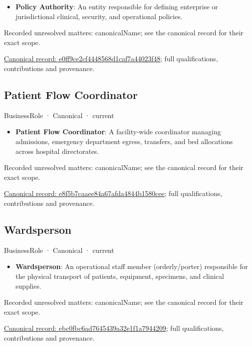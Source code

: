 \begin{itemize}


\item \textbf{Policy Authority}: An entity responsible for defining enterprise or jurisdictional clinical, security, and operational policies.

\end{itemize}

{\small Recorded unresolved matters: canonicalName; see the canonical record for their exact scope.}\par
{\footnotesize \href{../../../../continuum/business/business-role/e0ff9ce2cf4448568d1caf7a44023f48.md}{Canonical record: e0ff9ce2cf4448568d1caf7a44023f48}; full qualifications, contributions and provenance.}\par
\subsection{Patient Flow Coordinator}

\label{element:e8f5b7caaee84a67afda4844b1580cee}
{\small BusinessRole · Canonical · current}\par

\begin{itemize}


\item \textbf{Patient Flow Coordinator}: A facility-wide coordinator managing admissions, emergency department egress, transfers, and bed allocations across hospital directorates.

\end{itemize}

{\small Recorded unresolved matters: canonicalName; see the canonical record for their exact scope.}\par
{\footnotesize \href{../../../../continuum/business/business-role/e8f5b7caaee84a67afda4844b1580cee.md}{Canonical record: e8f5b7caaee84a67afda4844b1580cee}; full qualifications, contributions and provenance.}\par
\subsection{Wardsperson}

\label{element:ebc0fbc6ad7645439a32e1f1a7944209}
{\small BusinessRole · Canonical · current}\par

\begin{itemize}


\item \textbf{Wardsperson}: An operational staff member (orderly/porter) responsible for the physical transport of patients, equipment, specimens, and clinical supplies.

\end{itemize}

{\small Recorded unresolved matters: canonicalName; see the canonical record for their exact scope.}\par
{\footnotesize \href{../../../../continuum/business/business-role/ebc0fbc6ad7645439a32e1f1a7944209.md}{Canonical record: ebc0fbc6ad7645439a32e1f1a7944209}; full qualifications, contributions and provenance.}\par
